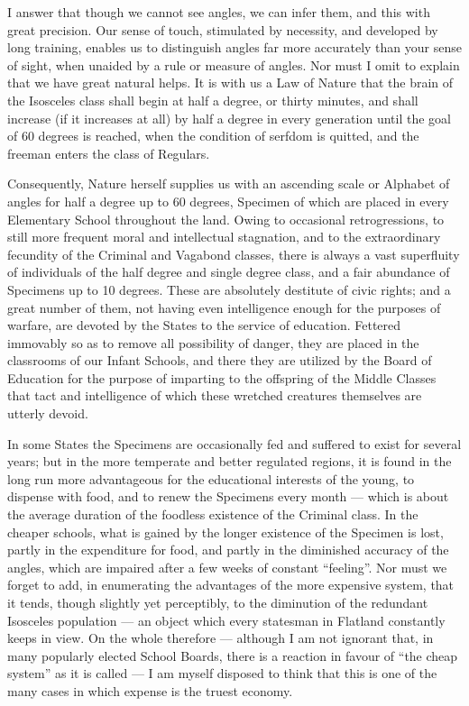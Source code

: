 \documentclass[12pt, a4paper, twoside]{memoir}
\begin{document}
I answer that though we cannot see angles, we can infer them, and this with
great precision. Our sense of touch, stimulated by necessity, and developed by
long training, enables us to distinguish angles far more accurately than your
sense of sight, when unaided by a rule or measure of angles. Nor must I omit
to explain that we have great natural helps. It is with us a Law of Nature
that the brain of the Isosceles class shall begin at half a degree, or thirty
minutes, and shall increase (if it increases at all) by half a degree in every
generation until the goal of 60 degrees is reached, when the condition of
serfdom is quitted, and the freeman enters the class of Regulars.

Consequently, Nature herself supplies us with an ascending scale or Alphabet
of angles for half a degree up to 60 degrees, Specimen of which are placed in
every Elementary School throughout the land. Owing to occasional
retrogressions, to still more frequent moral and intellectual stagnation, and
to the extraordinary fecundity of the Criminal and Vagabond classes, there is
always a vast superfluity of individuals of the half degree and single degree
class, and a fair abundance of Specimens up to 10 degrees. These are
absolutely destitute of civic rights; and a great number of them, not having
even intelligence enough for the purposes of warfare, are devoted by the
States to the service of education. Fettered immovably so as to remove all
possibility of danger, they are placed in the classrooms of our Infant
Schools, and there they are utilized by the Board of Education for the purpose
of imparting to the offspring of the Middle Classes that tact and intelligence
of which these wretched creatures themselves are utterly devoid.

In some States the Specimens are occasionally fed and suffered to exist for
several years; but in the more temperate and better regulated regions, it is
found in the long run more advantageous for the educational interests of the
young, to dispense with food, and to renew the Specimens every month --- which
is about the average duration of the foodless existence of the Criminal class.
In the cheaper schools, what is gained by the longer existence of the Specimen
is lost, partly in the expenditure for food, and partly in the diminished
accuracy of the angles, which are impaired after a few weeks of constant
``feeling''. Nor must we forget to add, in enumerating the advantages of the
more expensive system, that it tends, though slightly yet perceptibly, to the
diminution of the redundant Isosceles population --- an object which every
statesman in Flatland constantly keeps in view. On the whole therefore ---
although I am not ignorant that, in many popularly elected School Boards,
there is a reaction in favour of ``the cheap system'' as it is called --- I am
myself disposed to think that this is one of the many cases in which expense
is the truest economy.
\end{document}
